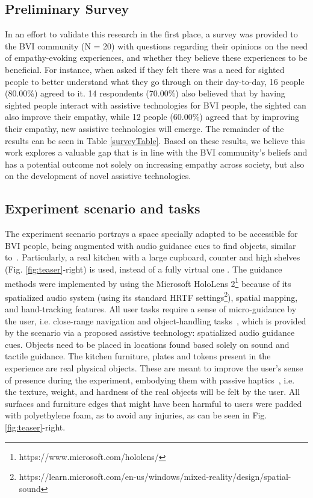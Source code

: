 \documentclass{vgtc}                          %
\begin{document}
\subsection{Preliminary Survey}

In an effort to validate this research in the first place, a survey was provided to the BVI community (N = 20) with questions regarding their opinions on the need of empathy-evoking experiences, and whether they believe these experiences to be beneficial. For instance, when asked if they felt there was a need for sighted people to better understand what they go through on their day-to-day, 16 people (80.00\%) agreed to it. 14 respondents (70.00\%) also believed that by having sighted people interact with assistive technologies for BVI people, the sighted can also improve their empathy, while 12 people (60.00\%) agreed that by improving their empathy, new assistive technologies will emerge. The remainder of the results can be seen in Table \ref{surveyTable}. Based on these results, we believe this work explores a valuable gap that is in line with the BVI community's beliefs and has a potential outcome not solely on increasing empathy across society, but also on the development of novel assistive technologies. 



\subsection{Experiment scenario and tasks}
\label{experiment}

The experiment scenario portrays a space specially adapted to be accessible for BVI people, being augmented with audio guidance cues to find objects, similar to~\cite{Iravantchi:2020, May:2019, guarese:2021}. Particularly, a real kitchen with a large cupboard, counter and high shelves (Fig. \ref{fig:teaser}-right) is used, instead of a fully virtual one \cite{May:2019}. The guidance methods were implemented by using the Microsoft HoloLens 2\footnote{https://www.microsoft.com/hololens/} because of its spatialized audio system (using its standard HRTF settings\footnote{https://learn.microsoft.com/en-us/windows/mixed-reality/design/spatial-sound}), spatial mapping, and hand-tracking features. All user tasks require a sense of micro-guidance by the user, i.e. close-range navigation and object-handling tasks~\cite{guarese:2022}, which is provided by the scenario via a proposed assistive technology: spatialized audio guidance cues. Objects need to be placed in locations found based solely on sound and tactile guidance. The kitchen furniture, plates and tokens present in the experience are real physical objects. These are meant to improve the user's sense of presence during the experiment, embodying them with passive haptics~\cite{Insko:2001}, i.e. the texture, weight, and hardness of the real objects will be felt by the user. All surfaces and furniture edges that might have been harmful to users were padded with polyethylene foam, as to avoid any injuries, as can be seen in Fig. \ref{fig:teaser}-right. 
\end{document}
